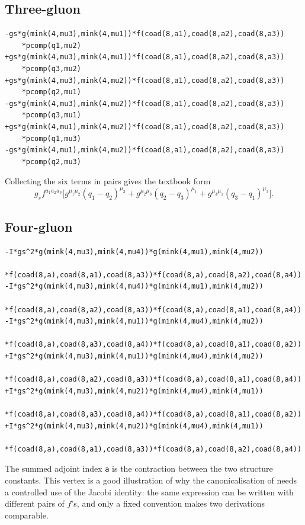 \subsection*{Three-gluon}

\begin{verbatim}
-gs*g(mink(4,mu3),mink(4,mu1))*f(coad(8,a1),coad(8,a2),coad(8,a3))
    *pcomp(q1,mu2)
+gs*g(mink(4,mu3),mink(4,mu1))*f(coad(8,a1),coad(8,a2),coad(8,a3))
    *pcomp(q3,mu2)
+gs*g(mink(4,mu3),mink(4,mu2))*f(coad(8,a1),coad(8,a2),coad(8,a3))
    *pcomp(q2,mu1)
-gs*g(mink(4,mu3),mink(4,mu2))*f(coad(8,a1),coad(8,a2),coad(8,a3))
    *pcomp(q3,mu1)
+gs*g(mink(4,mu1),mink(4,mu2))*f(coad(8,a1),coad(8,a2),coad(8,a3))
    *pcomp(q1,mu3)
-gs*g(mink(4,mu1),mink(4,mu2))*f(coad(8,a1),coad(8,a2),coad(8,a3))
    *pcomp(q2,mu3)
\end{verbatim}

\noindent Collecting the six terms in pairs gives the textbook form
\[
    g_s f^{a_1a_2a_3}\Big[
      g^{\mu_1\mu_2}(q_1-q_2)^{\mu_3}
    + g^{\mu_2\mu_3}(q_2-q_3)^{\mu_1}
    + g^{\mu_3\mu_1}(q_3-q_1)^{\mu_2}\Big].
\]

\subsection*{Four-gluon}

\begin{verbatim}
-I*gs^2*g(mink(4,mu3),mink(4,mu4))*g(mink(4,mu1),mink(4,mu2))
       *f(coad(8,a),coad(8,a1),coad(8,a3))*f(coad(8,a),coad(8,a2),coad(8,a4))
-I*gs^2*g(mink(4,mu3),mink(4,mu4))*g(mink(4,mu1),mink(4,mu2))
       *f(coad(8,a),coad(8,a2),coad(8,a3))*f(coad(8,a),coad(8,a1),coad(8,a4))
-I*gs^2*g(mink(4,mu3),mink(4,mu1))*g(mink(4,mu4),mink(4,mu2))
       *f(coad(8,a),coad(8,a3),coad(8,a4))*f(coad(8,a),coad(8,a1),coad(8,a2))
+I*gs^2*g(mink(4,mu3),mink(4,mu1))*g(mink(4,mu4),mink(4,mu2))
       *f(coad(8,a),coad(8,a2),coad(8,a3))*f(coad(8,a),coad(8,a1),coad(8,a4))
+I*gs^2*g(mink(4,mu3),mink(4,mu2))*g(mink(4,mu4),mink(4,mu1))
       *f(coad(8,a),coad(8,a3),coad(8,a4))*f(coad(8,a),coad(8,a1),coad(8,a2))
+I*gs^2*g(mink(4,mu3),mink(4,mu2))*g(mink(4,mu4),mink(4,mu1))
       *f(coad(8,a),coad(8,a1),coad(8,a3))*f(coad(8,a),coad(8,a2),coad(8,a4))
\end{verbatim}

\noindent The summed adjoint index \texttt{a} is the contraction between the
two structure constants. This vertex is a good illustration of why the
canonicalisation of  needs a controlled use of
the Jacobi identity: the same expression can be written with different pairs
of $f$'s, and only a fixed convention makes two derivations comparable.

